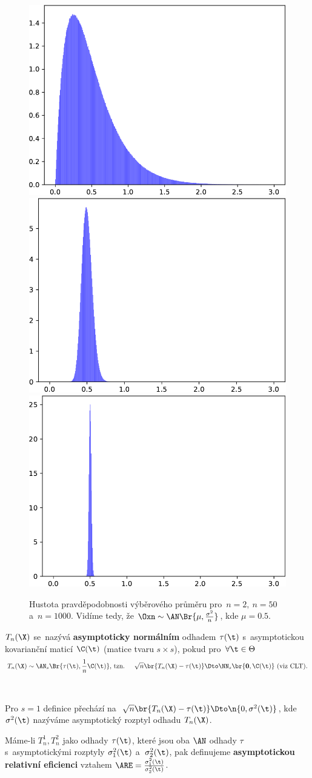 \begin{example}
	\begin{figure}[h]
		\centering
		\includegraphics[width=0.32\linewidth]{Images/histexp2}
		\includegraphics[width=0.32\linewidth]{Images/histexp50}
		\includegraphics[width=0.32\linewidth]{Images/histexp1000}
		\caption{Hustota pravděpodobnosti výběrového průměru pro~$n=2,~n=50$ a~$n=1000$. Vidíme tedy, že $\Oxn\sim\AN\Br{\mu,\frac{\sigma^2}{n}}$, kde $\mu=0.5$.}
		\label{fig:hist1}
	\end{figure}
\end{example}
\begin{define}
	$T_n(\X)$ se~nazývá \textbf{asymptoticky normálním} odhadem $\tau(\t)$ s~asymptotickou kovarianční maticí $\C(\t)$ (matice tvaru $s\times s$), pokud pro~$\forall\t\in\Theta$ $$ T_n(\X)\sim\AN_s\Br{\tau(\t),\frac{1}{n}\C(\t)}\text{, tzn. \quad } \sqrt{n}\br{T_n(\X)-\tau(\t)}\Dto \NN _s\br{\textbf{0},\C(\t)}\text{ (viz CLT)}. $$
	\\ \\
	Pro $s=1$ definice přechází na~$\sqrt{n}\br{T_n(\X)-\tau(\t)}\Dto \n{0,\sigma^2(\t)}$, kde $\sigma^2(\t)$ nazýváme asymptotický rozptyl odhadu $T_n(\X)$. 
\end{define}

\begin{define}
	Máme-li $T_n^1,T_n^2$ jako odhady $\tau(\t)$, které jsou oba $\AN$ odhady $\tau$ s~asymptotickými rozptyly $\sigma_1^2(\t)$ a~$\sigma_2^2(\t)$, pak definujeme \textbf{asymptotickou relativní eficienci} vztahem $\ARE=\frac{\sigma_1^2(\t)}{\sigma_2^2(\t)}$.
\end{define}

